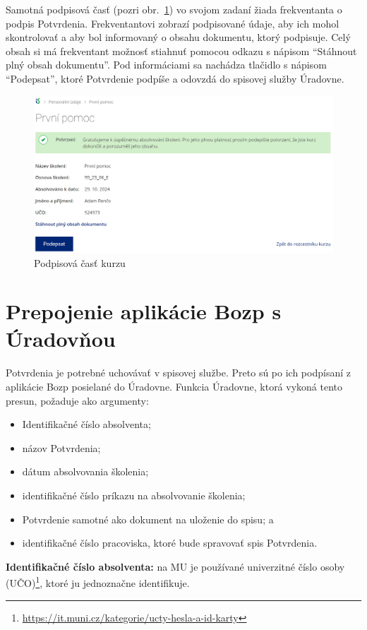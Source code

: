 \documentclass[
  digital,     %
  oneside,     %
  nosansbold,  %
  nocolorbold, %
  lof,         %
  nolot,         %
]{fithesis4}
\begin{document}
Samotná podpisová časť (pozri obr.~\ref{obr3}) vo svojom zadaní žiada frekventanta o podpis Potvrdenia. Frekventantovi zobrazí podpisované údaje, aby ich mohol skontrolovať a aby bol informovaný o obsahu dokumentu, ktorý podpisuje. Celý obsah si má frekventant možnosť stiahnuť pomocou odkazu s nápisom \enquote{Stáhnout plný obsah dokumentu}. Pod informáciami sa nachádza tlačidlo s nápisom \enquote{Podepsat}, ktoré Potvrdenie podpíše a odovzdá do spisovej služby Úradovne.

\begin{figure}
  \begin{center}
    \includegraphics[width=\textwidth]{podpiscast2.png}
  \end{center}
  \caption{Podpisová časť kurzu}
  \label{obr3}
\end{figure}

\section{Prepojenie aplikácie Bozp s Úradovňou}
Potvrdenia je potrebné uchovávať v spisovej službe. Preto sú po ich podpísaní z aplikácie Bozp posielané do Úradovne. Funkcia Úradovne, ktorá vykoná tento presun, požaduje ako argumenty:

\begin{itemize}
    \item Identifikačné číslo absolventa;
    \item názov Potvrdenia;
    \item dátum absolvovania školenia;
    \item identifikačné číslo príkazu na absolvovanie školenia;
    \item Potvrdenie samotné ako dokument na uloženie do spisu; a
    \item identifikačné číslo pracoviska, ktoré bude spravovať spis Potvrdenia.
\end{itemize}
\noindent
\textbf{Identifikačné číslo absolventa:} na MU je používané univerzitné číslo osoby (UČO)\footnote{\url{https://it.muni.cz/kategorie/ucty-hesla-a-id-karty}}, ktoré ju jednoznačne identifikuje.
\end{document}
